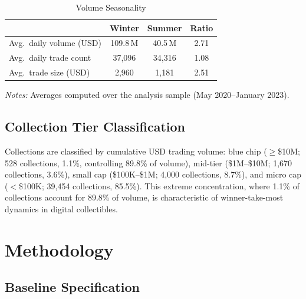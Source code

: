 \documentclass[12pt,a4paper]{article}
\begin{document}
\begin{table}[htbp]
\centering
\begin{threeparttable}
\caption{Volume Seasonality}
\label{tab:volume_season}

\begin{tabular*}{\textwidth}{@{\extracolsep{\fill}} lccc}
\toprule
& Winter & Summer & Ratio \\
\midrule
Avg.\ daily volume (USD) & 109.8\,M & 40.5\,M & 2.71 \\
Avg.\ daily trade count  & 37{,}096 & 34{,}316 & 1.08 \\
Avg.\ trade size (USD)   & 2{,}960 & 1{,}181 & 2.51 \\
\bottomrule
\end{tabular*}

\begin{tablenotes}[flushleft]
\footnotesize
\item \textit{Notes:} Averages computed over the analysis sample (May 2020--January 2023).
\end{tablenotes}

\end{threeparttable}
\end{table}

\subsection{Collection Tier Classification}

Collections are classified by cumulative USD trading volume: blue chip ($\geq$\$10M; 528 collections, 1.1\%, controlling 89.8\% of volume), mid-tier (\$1M--\$10M; 1,670 collections, 3.6\%), small cap (\$100K--\$1M; 4,000 collections, 8.7\%), and micro cap ($<$\$100K; 39,454 collections, 85.5\%). This extreme concentration, where 1.1\% of collections account for 89.8\% of volume, is characteristic of winner-take-most dynamics in digital collectibles.



\section{Methodology}\label{sec:methodology}

\subsection{Baseline Specification}
\end{document}
